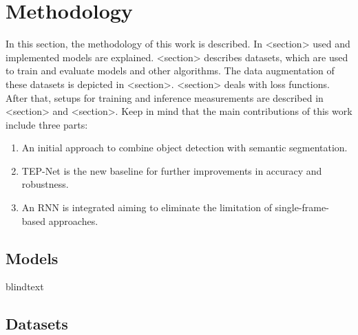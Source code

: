 \chapter{Methodology}
\label{sec:methodology}


In this section, the methodology of this work is described.
In <section> used and implemented models are explained.
<section> describes datasets, which are used to train and evaluate models and other algorithms.
The data augmentation of these datasets is depicted in <section>.
<section> deals with loss functions. After that, setups for training and inference measurements are described in <section> and <section>.
Keep in mind that the main contributions of this work include three parts:

\begin{enumerate}
    \item An initial approach to combine object detection with semantic segmentation.
    \item TEP-Net \cite{tepNet2024} is the new baseline for further improvements in accuracy and robustness.
    \item An RNN is integrated aiming to eliminate the limitation of single-frame-based approaches.
\end{enumerate}


\section{Models}

blindtext

%



\section{Datasets}

